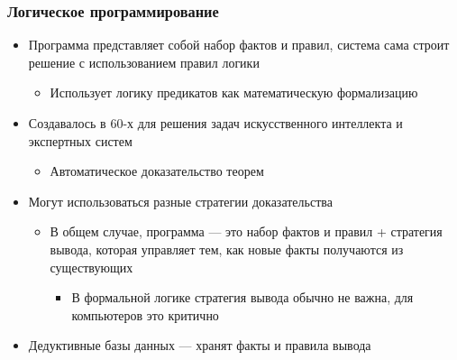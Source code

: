 \documentclass{../../slides-style}
\begin{document}
    
    \begin{frame}[plain]
        \titlepage
    \end{frame}

    \begin{frame}
        \frametitle{Логическое программирование}
        \begin{itemize}
            \item Программа представляет собой набор фактов и правил, система сама строит решение с использованием правил логики
            \begin{itemize}
                \item Использует логику предикатов как математическую формализацию
            \end{itemize}
            \item Создавалось в 60-х для решения задач искусственного интеллекта и экспертных систем
            \begin{itemize}
                \item Автоматическое доказательство теорем
            \end{itemize}
            \item Могут использоваться разные стратегии доказательства
            \begin{itemize}
                \item В общем случае, программа --- это набор фактов и правил + стратегия вывода, которая управляет тем, как новые факты получаются из существующих
                \begin{itemize}
                    \item В формальной логике стратегия вывода обычно не важна, для компьютеров это критично
                \end{itemize}
            \end{itemize}
            \item Дедуктивные базы данных --- хранят факты и правила вывода
        \end{itemize}
    \end{frame}
\end{document}
